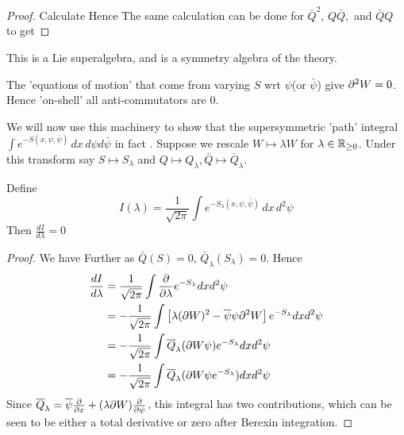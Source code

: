 \documentclass{article}
\begin{document}
\begin{proof}
	Calculate 
Hence 
The same calculation can be done for $\bar{Q}^2, \, Q\bar{Q},$ and $\bar{Q}Q$ to get
\end{proof}
\begin{remark}
	This is a Lie superalgebra, and is a symmetry algebra of the theory.
\end{remark}
\begin{remark}
	The 'equations of motion' that come from varying $S$ wrt $\psi$(or $\bar{\psi}$) give $\partial^2 W=0$. Hence 'on-shell' all anti-commutators are 0. 
\end{remark}
We will now use this machinery to show that the supersymmetric 'path' integral $\int e^{-S(x,\psi,\bar{\psi})} \, dx \, d\psi d\bar{\psi}$ in fact . Suppose we rescale $W \mapsto \lambda W $ for $\lambda \in \mathbb{R}_{\geq 0}$. Under this transform say $S \mapsto S_\lambda$ and $Q\mapsto Q_\lambda, \bar{Q} \mapsto \bar{Q}_\lambda $. 
\begin{prop}
	Define
\[
I(\lambda) = \frac{1}{\sqrt{2\pi}}\int e^{-S_\lambda(x,\psi,\bar{\psi})} \, dx \, d^2 \psi
\]
Then $\frac{dI}{d\lambda}=0$
\end{prop}
\begin{proof}
We have 
Further as $\bar{Q}(S)=0, \, \bar{Q}_\lambda (S_\lambda) = 0$. Hence 
\begin{align*}
    \frac{dI}{d\lambda} &= \frac{1}{\sqrt{2\pi}}\int \frac{\partial}{\partial\lambda} e^{-S_\lambda} dx d^2\psi \\
    &= -\frac{1}{\sqrt{2\pi}}\int \left[ \lambda (\partial W)^2 - \overline{\psi}\psi \partial^2 W \right] e^{-S_\lambda} dx d^2\psi \\
    &= -\frac{1}{\sqrt{2\pi}}\int \overline{Q}_\lambda (\partial W \psi) e^{-S_\lambda} dx d^2 \psi \\
    &= -\frac{1}{\sqrt{2\pi}}\int \overline{Q}_\lambda (\partial W \psi e^{-S_\lambda}) dx d^2 \psi \\
\end{align*}
Since $\overline{Q}_\lambda = \overline{\psi} \frac{\partial}{\partial x} + (\lambda \partial W) \frac{\partial}{\partial\psi}$, this integral has two contributions, which can be seen to be either a total derivative or zero after Berexin integration. 
\end{proof}
\end{document}
